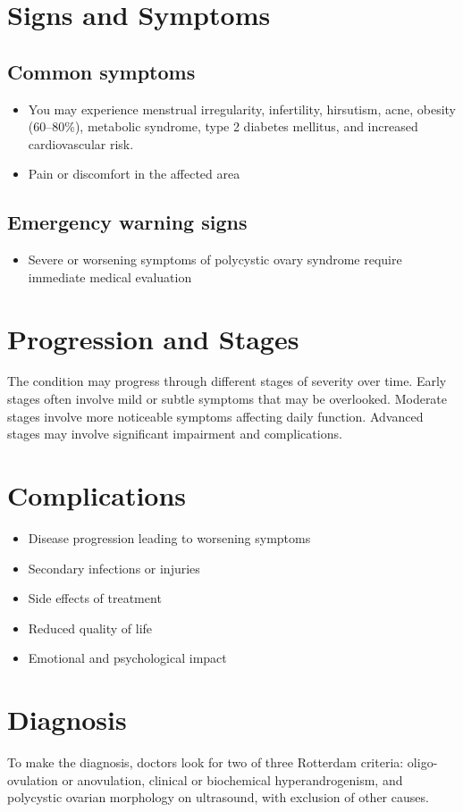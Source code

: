 \section{Signs and Symptoms}

\subsection{Common symptoms}
\begin{itemize}[noitemsep]
  \item You may experience menstrual irregularity, infertility, hirsutism, acne, obesity (60--80\%), metabolic syndrome, type 2 diabetes mellitus, and increased cardiovascular risk.
  \item Pain or discomfort in the affected area
  \end{itemize}

\subsection{Emergency warning signs}
\begin{itemize}[noitemsep]
  \item Severe or worsening symptoms of polycystic ovary syndrome require immediate medical evaluation
\end{itemize}
\section{Progression and Stages}
The condition may progress through different stages of severity over time. Early stages often involve mild or subtle symptoms that may be overlooked. Moderate stages involve more noticeable symptoms affecting daily function. Advanced stages may involve significant impairment and complications.
\section{Complications}
\begin{itemize}[noitemsep]
  \item Disease progression leading to worsening symptoms
  \item Secondary infections or injuries
  \item Side effects of treatment
  \item Reduced quality of life
  \item Emotional and psychological impact
\end{itemize}
\section{Diagnosis}
To make the diagnosis, doctors look for two of three Rotterdam criteria: oligo-ovulation or anovulation, clinical or biochemical hyperandrogenism, and polycystic ovarian morphology on ultrasound, with exclusion of other causes.

